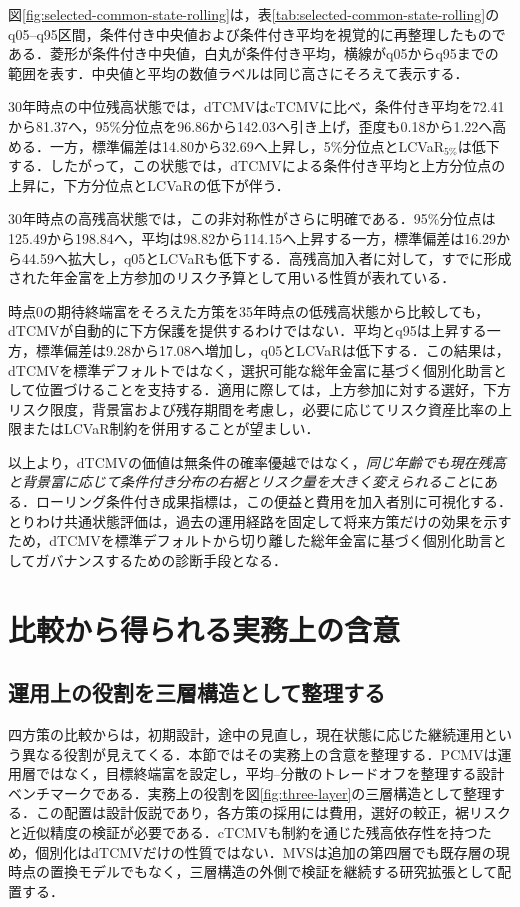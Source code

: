 \documentclass[10pt,a4paper]{article}
\theoremstyle{plain}
\theoremstyle{definition}
\begin{document}
図\ref{fig:selected-common-state-rolling}は，表\ref{tab:selected-common-state-rolling}のq05--q95区間，条件付き中央値および条件付き平均を視覚的に再整理したものである．菱形が条件付き中央値，白丸が条件付き平均，横線がq05からq95までの範囲を表す．中央値と平均の数値ラベルは同じ高さにそろえて表示する．

30年時点の中位残高状態では，dTCMVはcTCMVに比べ，条件付き平均を72.41から81.37へ，95\%分位点を96.86から142.03へ引き上げ，歪度も0.18から1.22へ高める．一方，標準偏差は14.80から32.69へ上昇し，5\%分位点とLCVaR$_{5\%}$は低下する．したがって，この状態では，dTCMVによる条件付き平均と上方分位点の上昇に，下方分位点とLCVaRの低下が伴う．

30年時点の高残高状態では，この非対称性がさらに明確である．95\%分位点は125.49から198.84へ，平均は98.82から114.15へ上昇する一方，標準偏差は16.29から44.59へ拡大し，q05とLCVaRも低下する．高残高加入者に対して，すでに形成された年金富を上方参加のリスク予算として用いる性質が表れている．

時点0の期待終端富をそろえた方策を35年時点の低残高状態から比較しても，dTCMVが自動的に下方保護を提供するわけではない．平均とq95は上昇する一方，標準偏差は9.28から17.08へ増加し，q05とLCVaRは低下する．この結果は，dTCMVを標準デフォルトではなく，選択可能な総年金富に基づく個別化助言として位置づけることを支持する．適用に際しては，上方参加に対する選好，下方リスク限度，背景富および残存期間を考慮し，必要に応じてリスク資産比率の上限またはLCVaR制約を併用することが望ましい．

以上より，dTCMVの価値は無条件の確率優越ではなく，\emph{同じ年齢でも現在残高と背景富に応じて条件付き分布の右裾とリスク量を大きく変えられること}にある．ローリング条件付き成果指標は，この便益と費用を加入者別に可視化する．とりわけ共通状態評価は，過去の運用経路を固定して将来方策だけの効果を示すため，dTCMVを標準デフォルトから切り離した総年金富に基づく個別化助言としてガバナンスするための診断手段となる．

\section{比較から得られる実務上の含意}\label{sec:implementation}

\subsection{運用上の役割を三層構造として整理する}
四方策の比較からは，初期設計，途中の見直し，現在状態に応じた継続運用という異なる役割が見えてくる．本節ではその実務上の含意を整理する．PCMVは運用層ではなく，目標終端富を設定し，平均--分散のトレードオフを整理する設計ベンチマークである．実務上の役割を図\ref{fig:three-layer}の三層構造として整理する．この配置は設計仮説であり，各方策の採用には費用，選好の較正，裾リスクと近似精度の検証が必要である．cTCMVも制約を通じた残高依存性を持つため，個別化はdTCMVだけの性質ではない．MVSは追加の第四層でも既存層の現時点の置換モデルでもなく，三層構造の外側で検証を継続する研究拡張として配置する．
\end{document}
